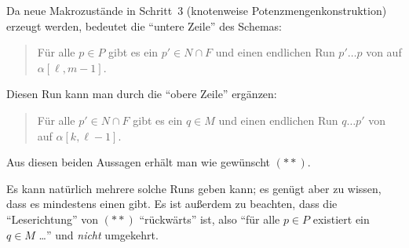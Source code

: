 \documentclass[fontsize=11pt, twoside=false, numbers=autoenddot]{scrbook}
\begin{document}
%
Da neue Makrozustände in Schritt~3 (knotenweise Potenzmengenkonstruktion) erzeugt werden,
bedeutet die "`untere Zeile"' des Schemas:
%
\begin{quote}
  Für alle $p \in P$ gibt es ein $p' \in N \cap F$ und einen endlichen Run $p'\dots p$
  von \Amc auf $\alpha[\ell,m-1]$.
\end{quote}
%
Diesen Run kann man durch die "`obere Zeile"' ergänzen:
%
\begin{quote}
  Für alle $p' \in N \cap F$ gibt es ein $q \in M$ und einen endlichen Run $q\dots p'$
  von \Amc auf $\alpha[k,\ell-1]$.
\end{quote}
%
Aus diesen beiden Aussagen erhält man wie gewünscht $(**)$.

Es kann natürlich mehrere solche Runs geben kann;
es genügt aber zu wissen, dass es mindestens einen gibt.
Es ist außerdem zu beachten, dass die "`Leserichtung"'
von $(**)$ "`rückwärts"' ist, also "`für alle $p \in P$ existiert ein $q \in M$ \dots"'
und \emph{nicht} umgekehrt.
\end{document}
